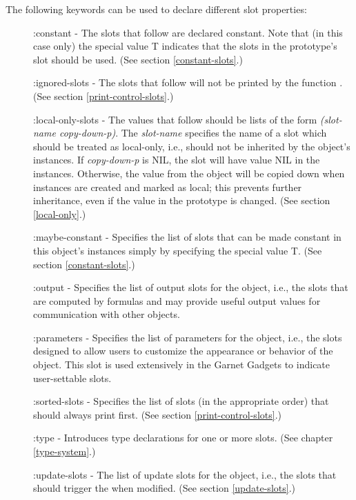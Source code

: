 \vspace{1 line}
\begin{group}
The following keywords can be used to declare different slot properties:

\begin{description}
\item[] {\sc :constant} - The slots that follow are declared constant.  Note that (in
this case only) the special value T indicates that the slots in the
prototype's  slot should be used.  (See section
\ref{constant-slots}.)

\item[] {\sc :ignored-slots} - The slots that follow will not be printed by the
function .  (See section \ref{print-control-slots}.)

\item[] {\sc :local-only-slots} - The values that follow should be lists of the form
{\it (slot-name  copy-down-p)}.  The {\it slot-name} specifies the name of a slot
which should be treated as local-only, i.e., should not be inherited by the
object's instances.  If {\it copy-down-p} is NIL, the slot will have value NIL in
the instances.  Otherwise, the value from the object will be copied
down when instances are created and marked as local; this prevents
further inheritance, even if the value in the prototype is changed.
(See section \ref{local-only}.)

\item[] {\sc :maybe-constant} - Specifies the list of slots that can be made constant
in this object's instances simply by specifying the special value T.
(See section \ref{constant-slots}.)

\item[] {\sc :output} - Specifies the list of output slots for the object, i.e., the
slots that are computed by formulas and may provide useful output
values for communication with other objects.

\item[] {\sc :parameters} - Specifies the list of parameters for the object, i.e.,
the slots designed to allow users to customize the appearance or
behavior of the object.  This slot is used extensively in the Garnet Gadgets
to indicate user-settable slots.

\item[] {\sc :sorted-slots} - Specifies the list of slots (in the appropriate order)
that  should always print first.
(See section \ref{print-control-slots}.)

\item[] {\sc :type} - Introduces type declarations for one or more slots.
(See chapter \ref{type-system}.)

\item[] {\sc :update-slots} - The list of update slots for the object, i.e., the
slots that should trigger the  when modified.
(See section \ref{update-slots}.)
\end{description}
\end{group}


